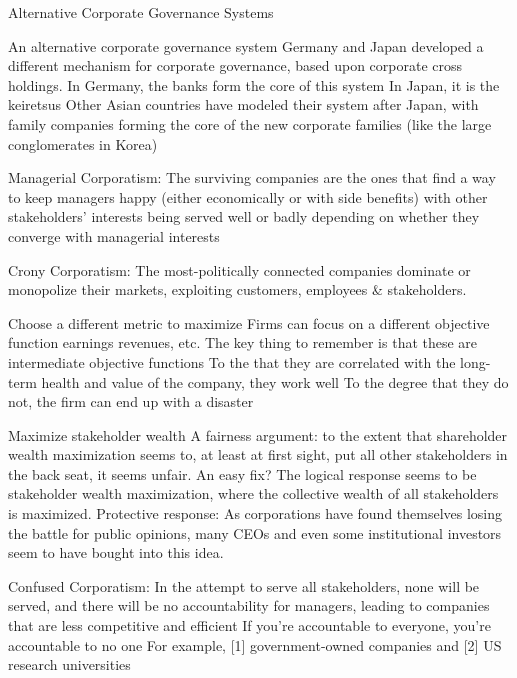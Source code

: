 \documentclass[10pt]{article}
\begin{document}
    \begin{core}{Alternative Corporate Governance Systems}

      An alternative corporate governance system
      Germany and Japan developed a different mechanism for corporate governance, based upon corporate cross holdings.
      In Germany, the banks form the core of this system
      In Japan, it is the keiretsus
      Other Asian countries have modeled their system after Japan, with family companies forming the core of the new corporate families (like the large conglomerates in Korea)

      Managerial Corporatism: The surviving companies are the ones that find a way to keep managers happy (either economically or with side benefits) with other stakeholders’ interests being served well or badly depending on whether they converge with managerial interests

      Crony Corporatism: The most-politically connected companies dominate or monopolize their markets, exploiting customers, employees & stakeholders.

      Choose a different metric to maximize
      Firms can focus on a different objective function
      earnings
      revenues, etc.
      The key thing to remember is that these are intermediate objective functions
      To the that they are correlated with the long-term health and value of the company, they work well
      To the degree that they do not, the firm can end up with a disaster

      Maximize stakeholder wealth
      A fairness argument: to the extent that shareholder wealth maximization seems to, at least at first sight, put all other stakeholders in the back seat, it seems unfair.
      An easy fix? The logical response seems to be stakeholder wealth maximization, where the collective wealth of all stakeholders is maximized.
      Protective response: As corporations have found themselves losing the battle for public opinions, many CEOs and even some institutional investors seem to have bought into this idea.

      Confused Corporatism: In the attempt to serve all stakeholders, none will be served, and there will be no accountability for managers, leading to companies that are less competitive and efficient
      If you’re accountable to everyone, you’re accountable to no one
      For example, [1] government-owned companies and [2] US research universities 

    \end{core}
\end{document}

